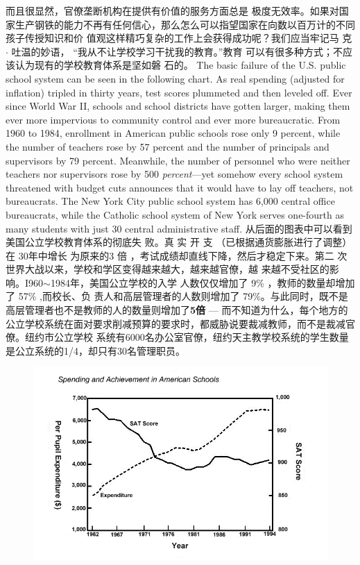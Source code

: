 \begin{paracol}{2}
\switchcolumn
而且很显然，官僚垄断机构在提供有价值的服务方面总是
极度无效率。如果对国家生产钢铁的能力不再有任何信心，那么怎么可以指望国家在向数以百万计的不同孩子传授知识和价
值观这样精巧复杂的工作上会获得成功呢？我们应当牢记马
克 $\cdot$ 吐温的妙语， “我从不让学校学习干扰我的教育。”教育
可以有很多种方式；不应该认为现有的学校教育体系是坚如磐
石的。
\switchcolumn*
The basic failure of the U.S. public school system can be seen
in the following chart. As real spending (adjusted for inflation)
tripled in thirty years, test scores plummeted and then leveled
off. Ever since World War II, schools and school districts have
gotten larger, making them ever more impervious to community control and ever more bureaucratic. From 1960 to 1984,
enrollment in American public schools rose only 9 percent,
while the number of teachers rose by 57 percent and the number of principals and supervisors by 79 percent. Meanwhile, the
number of personnel who were neither teachers nor supervisors
rose by 500 \textit{percent}---yet somehow every school system threatened with budget cuts announces that it would have to lay off
teachers, not bureaucrats. The New York City public school
system has 6,000 central office bureaucrats, while the Catholic
school system of New York serves one-fourth as many students
with just 30 central administrative staff.
\switchcolumn
从后面的图表中可以看到美国公立学校教育体系的彻底失
败。真 实 开 支 （已根据通货膨胀进行了调整）在 30年中增长
为原来的3 倍 ，考试成绩却直线下降，然后才稳定下来。第二
次世界大战以来，学校和学区变得越来越大，越来越官僚，越
来越不受社区的影响。I960$\sim$1984年，美国公立学校的入学
人数仅仅增加了 9\% ，教师的数量却增加了 57\% ,而校长、负
责人和高层管理者的人数则增加了 79\%。与此同时，既不是
高层管理者也不是教师的人的数量则增加了\textbf{5倍} --- 而不知道为什么，每个地方的公立学校系统在面对要求削减预算的要求时，都威胁说要裁减教师，而不是裁减官僚。纽约市公立学校
系统有6000名办公室官僚，纽约天主教学校系统的学生数量是公立系统的1/4，却只有30名管理职员。
\newpage
\switchcolumn*
\begin{figure}
	\centering
	\includegraphics[width=\linewidth]{3}

\end{figure}
\end{paracol}
